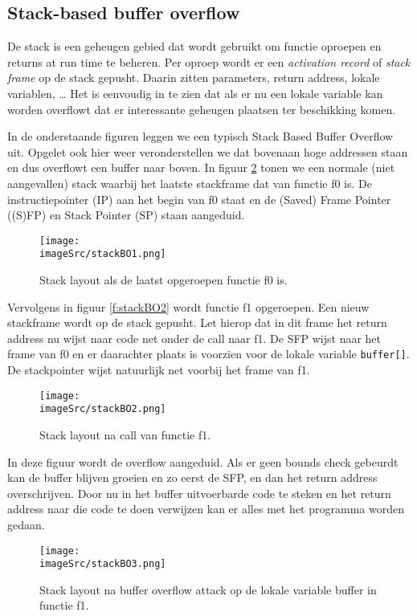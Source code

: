 \documentclass[../main.tex]{subfiles}
\begin{document}
\subsection{Stack-based buffer overflow}
De stack is een geheugen gebied dat wordt gebruikt om functie oproepen en returns at run time te beheren.
Per oproep wordt er een \emph{activation record} of \emph{stack frame} op de stack gepusht. Daarin zitten parameters, return address, lokale variablen, \ldots
Het is eenvoudig in te zien dat als er nu een lokale variable kan worden overflowt dat er interessante geheugen plaatsen ter beschikking komen.

In de onderstaande figuren leggen we een typisch Stack Based Buffer Overflow uit. Opgelet ook hier weer veronderstellen we dat bovenaan hoge addressen staan en dus overflowt een buffer naar boven.
In figuur \ref{f:stackBO1} tonen we een normale (niet aangevallen) stack waarbij het laatste stackframe dat van functie f0 is. De instructiepointer (IP) aan het begin van f0 staat en de (Saved) Frame Pointer ((S)FP) en Stack Pointer (SP) staan aangeduid.
\begin{figure}
\centering
\texttt{[image: \\imageSrc/stackBO1.png]}
\caption{Stack layout als de laatst opgeroepen functie f0 is.}
\label{f:stackBO1}
\end{figure}

Vervolgens in figuur \ref{f:stackBO2} wordt functie f1 opgeroepen. Een nieuw stackframe wordt op de stack gepusht. Let hierop dat in dit frame het return address nu wijst naar code net onder de call naar f1. De SFP wijst naar het frame van f0 en er daarachter plaats is voorzien voor de lokale variable \lstinline[style=cstyle]{buffer[]}. De stackpointer wijst natuurlijk net voorbij het frame van f1.
\begin{figure}
\centering
\texttt{[image: \\imageSrc/stackBO2.png]}
\caption{Stack layout na call van functie f1.}
\label{f:stackBO1}
\end{figure}

In deze figuur wordt de overflow aangeduid. Als er geen bounds check gebeurdt kan de buffer blijven groeien en zo eerst de SFP, en dan het return address overschrijven. Door nu in het buffer uitvoerbarde code te steken en het return address naar die code te doen verwijzen kan er alles met het programma worden gedaan.
\begin{figure}
\centering
\texttt{[image: \\imageSrc/stackBO3.png]}
\caption{Stack layout na buffer overflow attack op de lokale variable buffer in functie f1.}
\label{f:stackBO3}
\end{figure}
\end{document}
